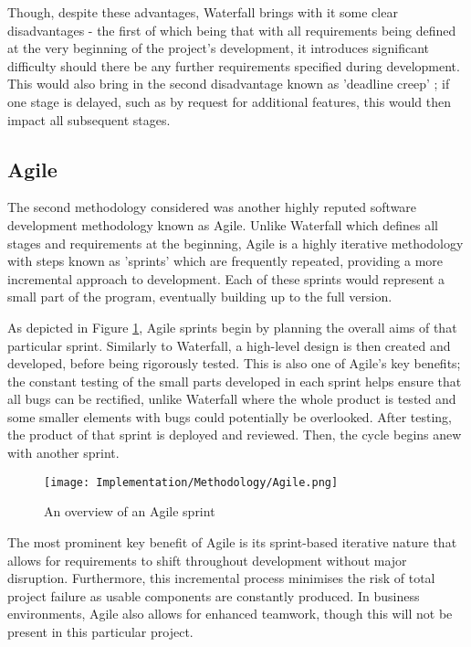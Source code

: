 \para Though, despite these advantages, Waterfall brings with it some clear disadvantages - the first of which 
being that with all requirements being defined at the very beginning of the project's development,
it introduces significant difficulty should there be any further requirements specified during development. This would also 
bring in the second disadvantage known as 'deadline creep' \autocite{adobeWaterfallMethodologyProject}; 
if one stage is delayed, such as by request for additional features, this would then impact all subsequent stages. 

\subsection{Agile}
The second methodology considered was another highly reputed software development methodology known as Agile.
Unlike Waterfall which defines all stages and requirements at the beginning, Agile is a highly iterative methodology with steps
known as 'sprints' which are frequently repeated, providing a more incremental approach to development. Each of these sprints
would represent a small part of the program, eventually building up to the full version.

\para As depicted in Figure \ref{fig:ExampleAgileSprint}, 
Agile sprints begin by planning the overall aims of that particular sprint. Similarly to Waterfall, a high-level
design is then created and developed, before being rigorously tested. This is also one of Agile's key benefits; the 
constant testing of the small parts developed in each sprint helps ensure that all bugs can be rectified, unlike 
Waterfall where the whole product is tested and some smaller elements with bugs could potentially be overlooked.
After testing, the product of that sprint is deployed and reviewed. Then, the cycle begins anew with another 
sprint.

\begin{figure}[H]
    \centering
    \texttt{[image: Implementation/Methodology/Agile.png]}
    \caption{An overview of an Agile sprint \autocite{asanaWhatAgileMethodology}\label{fig:ExampleAgileSprint}}
\end{figure}


\noindent The most prominent key benefit of Agile is its sprint-based iterative nature that allows for requirements to shift 
throughout development without major disruption. Furthermore, this incremental process minimises the risk of total project 
failure as usable components are constantly produced. In business environments, Agile also allows for enhanced teamwork, though 
this will not be present in this particular project.

